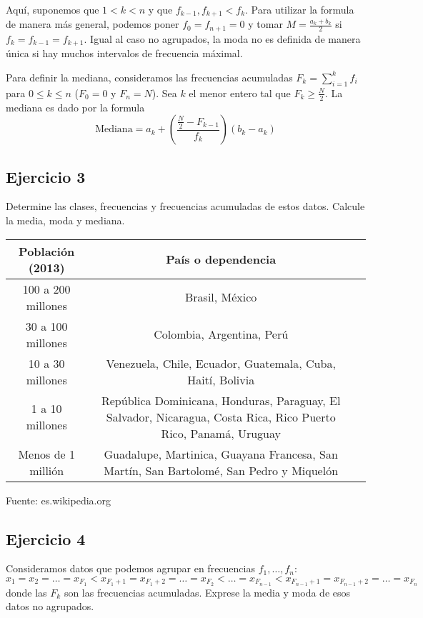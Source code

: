 Aquí, suponemos que $1 < k < n$ y que $f_{k-1}, f_{k+1} < f_k$. Para utilizar
la formula de manera más general, podemos poner $f_0 = f_{n+1} = 0$ y
tomar $M = \frac{a_k+b_k}{2}$ si $f_k = f_{k-1} = f_{k+1}$. Igual al caso
no agrupados, la moda no es definida de manera única si hay muchos
intervalos de frecuencia máximal.

Para definir la mediana, consideramos las frecuencias acumuladas
$F_k = \sum_{i=1}^k f_i$ para $0 \leq k \leq n$ ($F_0 = 0$ y
$F_n = N$). Sea $k$ el menor
entero tal que $F_k \geq \frac{N}{2}$. La mediana es dado por la formula
$$
\text{Mediana} =
a_k + \left( \frac{\frac{N}{2} - F_{k-1}}{f_k}
\right) \left(b_k - a_k \right)
$$

\subsection{Ejercicio 3}

Determine las clases, frecuencias y frecuencias acumuladas de estos datos.
Calcule la media, moda y mediana.

\begin{center}
\begin{tabular}{| c | c | c |}
  \hline
  Población (2013) & País o dependencia \\
  \hline
  100 a 200 millones & Brasil, México \\
  \hline
  30 a 100 millones &  Colombia, Argentina, Perú \\
  \hline
  10 a 30 millones & Venezuela, Chile, Ecuador, Guatemala,
  Cuba, Haití, Bolivia \\
  \hline
  1 a 10 millones & República Dominicana, Honduras, Paraguay, El Salvador,
  Nicaragua, Costa Rica, Rico Puerto Rico, Panamá, Uruguay \\
  \hline
  Menos de 1 millión & Guadalupe, Martinica, Guayana Francesa, San Martín,
  San Bartolomé, San Pedro y Miquelón \\
  \hline
\end{tabular}

Fuente: es.wikipedia.org
\end{center}

\subsection{Ejercicio 4}

Consideramos datos que podemos agrupar en frecuencias $f_1, \ldots, f_n$:
$x_1 = x_2 = \ldots = x_{F_1} < x_{F_1+1} = x_{F_1+2} = \ldots = x_{F_2} < \ldots
= x_{F_{n-1}} < x_{F_{n-1}+1} = x_{F_{n-1}+2} = \ldots =
x_{F_{n}}$ donde las $F_k$ son las frecuencias acumuladas.
Exprese la media y moda de esos datos no agrupados.

